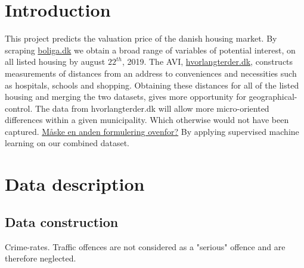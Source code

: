 \documentclass[12pt,a4paper]{article}
\begin{document}

\newpage
\onehalfspacing

\tableofcontents
\newpage
\section{Introduction}
This project predicts the valuation price of the danish housing market. By scraping \href{https://www.boliga.dk}{boliga.dk} we obtain a broad range of variables of potential interest, on all listed housing by august $22^{th}$, 2019. The AVI, \href{https://www.hvorlangterder.dk}{hvorlangterder.dk}, constructs measurements of distances from an address to conveniences and necessities such as hospitals, schools and shopping. Obtaining these distances for all of the listed housing and merging the two datasets, gives more opportunity for geographical-control. The data from hvorlangterder.dk will allow more micro-oriented differences within a given municipality. Which otherwise would not have been captured.  
\newline \underline{Måske en anden formulering ovenfor?} 
By applying supervised machine learning on our combined dataset.  
\section{Data description}
\subsection{Data construction}
Crime-rates. Traffic offences are not considered as a "serious" offence and are therefore neglected. 
\end{document}
